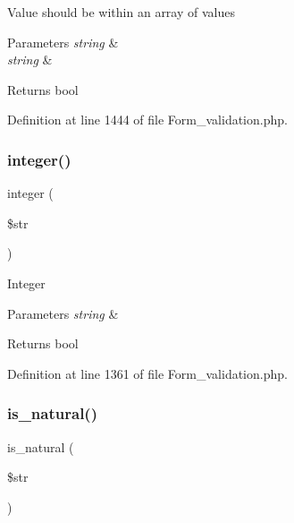 Value should be within an array of values


\begin{DoxyParams}{Parameters}
{\em string} & \\
\hline
{\em string} & \\
\hline
\end{DoxyParams}
\begin{DoxyReturn}{Returns}
bool 
\end{DoxyReturn}


Definition at line 1444 of file Form\+\_\+validation.\+php.

\mbox{\label{class_c_i___form__validation_af1c6586c2e80ccbb28b09803c3b5461c}} 
\subsubsection{\texorpdfstring{integer()}{integer()}}
{\footnotesize\ttfamily integer (\begin{DoxyParamCaption}\item[{}]{\$str }\end{DoxyParamCaption})}

Integer


\begin{DoxyParams}{Parameters}
{\em string} & \\
\hline
\end{DoxyParams}
\begin{DoxyReturn}{Returns}
bool 
\end{DoxyReturn}


Definition at line 1361 of file Form\+\_\+validation.\+php.

\mbox{\label{class_c_i___form__validation_aaf9d0b9bdaaef3658a78dd6a01629e5d}} 
\subsubsection{\texorpdfstring{is\_natural()}{is\_natural()}}
{\footnotesize\ttfamily is\+\_\+natural (\begin{DoxyParamCaption}\item[{}]{\$str }\end{DoxyParamCaption})}

